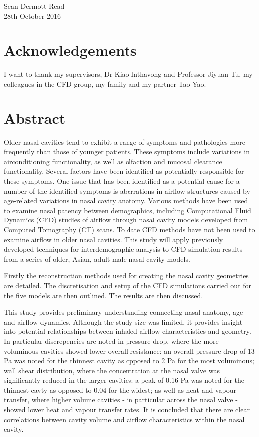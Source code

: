 \documentclass[12pt]{report}
\begin{document}
\vspace{0.3cm}
\noindent
Sean Dermott Read\\

\noindent
28th October 2016
\chapter*{Acknowledgements}
I want to thank my supervisors, Dr Kiao Inthavong and Professor Jiyuan Tu, my colleagues in the CFD group, my family and my partner Tao Yao. 

\tableofcontents

\newpage
\listoffigures
\listoftables

\chapter*{Abstract}
Older nasal cavities tend to exhibit a range of symptoms and pathologies more frequently than those of younger patients. These symptoms include variations in airconditioning functionality, as well as olfaction and mucosal clearance functionality. 
Several factors have been identified as potentially responsible for these symptoms. 
One issue that has been identified as a potential cause for a number of the identified symptoms is aberrations in airflow structures caused by age-related variations in nasal cavity anatomy. 
Various methods have been used to examine nasal patency between demographics, including Computational Fluid Dynamics (CFD) studies of airflow through nasal cavity models developed from Computed Tomography (CT) scans. 
To date CFD methods have not been used to examine airflow in older nasal cavities.
This study will apply previously developed techniques for interdemographic analysis to CFD simulation results from a series of older, Asian, adult male nasal cavity models.


Firstly the reconstruction methods used for creating the nasal cavity geometries are detailed.
The discretisation and setup of the CFD simulations carried out for the five models are then outlined.
The results are then discussed.


This study provides preliminary understanding connecting nasal anatomy, age and airflow dynamics. Although the study size was limited, it provides insight into potential relationships between inhaled airflow characteristics and geometry. In particular discrepencies are noted in pressure drop, where the more voluminous cavities showed lower overall resistance: an overall pressure drop of 13 Pa was noted for the thinnest cavity as opposed to 2 Pa for the most voluminous; wall shear distribution, where the concentration at the nasal valve was significantly reduced in the larger cavities: a peak of 0.16 Pa was noted for the thinnest cavty as opposed to 0.04 for the widest; as well as heat and vapour transfer, where higher volume cavities - in particular across the nasal valve - showed lower heat and vapour transfer rates. It is concluded that there are clear correlations between cavity volume and airflow characteristics within the nasal cavity.
\end{document}
